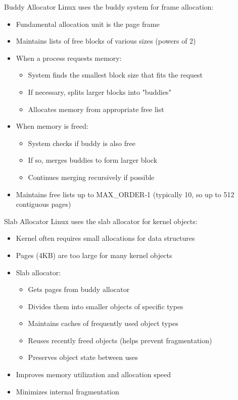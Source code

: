 \begin{theorem}{Buddy Allocator}
    Linux uses the buddy system for frame allocation:
    \begin{itemize}
        \item Fundamental allocation unit is the page frame
        \item Maintains lists of free blocks of various sizes (powers of 2)
        \item When a process requests memory:
            \begin{itemize}
                \item System finds the smallest block size that fits the request
                \item If necessary, splits larger blocks into "buddies"
                \item Allocates memory from appropriate free list
            \end{itemize}
        \item When memory is freed:
            \begin{itemize}
                \item System checks if buddy is also free
                \item If so, merges buddies to form larger block
                \item Continues merging recursively if possible
            \end{itemize}
        \item Maintains free lists up to MAX\_ORDER-1 (typically 10, so up to 512 contiguous pages)
    \end{itemize}
\end{theorem}

\begin{theorem}{Slab Allocator}
    Linux uses the slab allocator for kernel objects:
    \begin{itemize}
        \item Kernel often requires small allocations for data structures
        \item Pages (4KB) are too large for many kernel objects
        \item Slab allocator:
            \begin{itemize}
                \item Gets pages from buddy allocator
                \item Divides them into smaller objects of specific types
                \item Maintains caches of frequently used object types
                \item Reuses recently freed objects (helps prevent fragmentation)
                \item Preserves object state between uses
            \end{itemize}
        \item Improves memory utilization and allocation speed
        \item Minimizes internal fragmentation
    \end{itemize}
\end{theorem}

